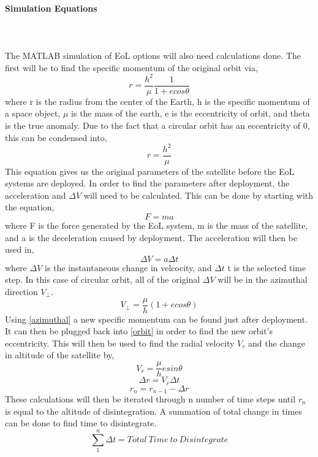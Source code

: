 \paragraph {Simulation Equations} ~\\~\\
The MATLAB simulation of EoL options will also need calculations done. The first will be to find the specific momentum of the original orbit via,
\begin{equation}
\label{orbit}
    r = \frac{h^{2}}{\mu} \frac{1}{1+ecos\theta}
\end{equation}
where r is the radius from the center of the Earth, h is the specific momentum of a space object, $\mu$ is the mass of the earth, e is the eccentricity of orbit, and theta is the true anomaly. Due to the fact that a circular orbit has an eccentricity of 0, this can be condensed into,
\begin{equation}
\label{simplified orbit}
    r = \frac{h^{2}}{\mu}
\end{equation}
This equation gives us the original parameters of the satellite before the EoL systems are deployed. In order to find the parameters after deployment, the acceleration and $\Delta V$ will need to be calculated. This can be done by starting with the equation, 
$$F = ma$$
where F is the force generated by the EoL system, m is the mass of the satellite, and a is the deceleration caused by deployment. The acceleration will then be used in,
\begin{equation}
\label{Delta V}
    \Delta V = a\Delta t
\end{equation}
where $\Delta V$ is the instantaneous change in velcocity, and $\Delta t$ t is the selected time step. In this case of circular orbit, all of the original $\Delta V$ will be in the azimuthal direction $V_{\perp}$. 
\begin{equation}
\label{azimuthal}
    V_{\perp} = \frac{\mu}{h}(1+ecos\theta)
\end{equation}
Using \ref{azimuthal} a new specific momentum can be found just after deployment. It can then be plugged back into \ref{orbit} in order to find the new orbit's eccentricity. This will then be used to find the radial velocity $V_{r}$ and the change in altitude of the satellite by,
\begin{equation}
\label{radial}
    V_{r} = \frac{\mu}{h}esin\theta
\end{equation}
\begin{equation}
\label{radius change}
    \Delta r = V_{r}\Delta t
\end{equation}
\begin{equation}
\label{new radius}
    r_{n} = r_{n-1} - \Delta r
\end{equation}
These calculations will then be iterated through n number of time steps until $r_{n}$ is equal to the altitude of disintegration. A summation of total change in times can be done to find time to disintegrate.
\begin{equation}
\label{time sum}
    \sum_{1}^{n} \Delta t = Total \: Time \: to \: Disintegrate
\end{equation}
